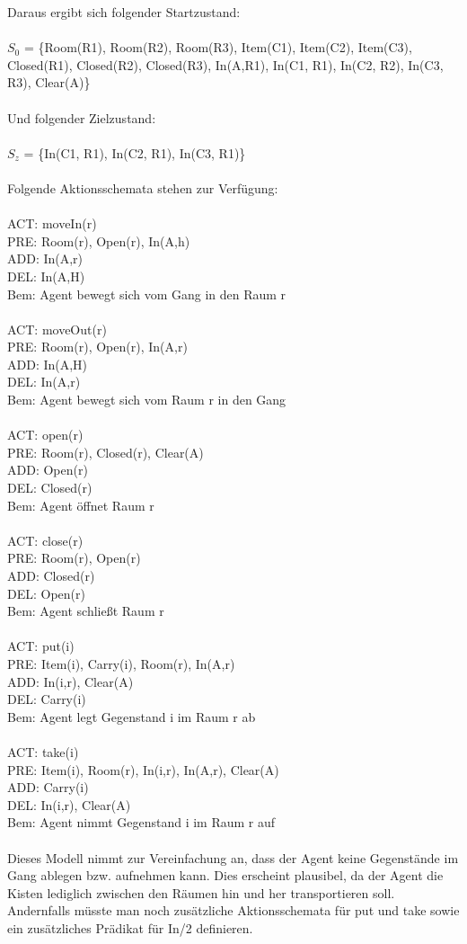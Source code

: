 \documentclass[a4paper]{article}
\begin{document}
Daraus ergibt sich folgender Startzustand:\\
\\
$S_0$ = \{Room(R1), Room(R2), Room(R3), Item(C1), Item(C2), Item(C3), Closed(R1), Closed(R2), Closed(R3),
In(A,R1), In(C1, R1), In(C2, R2), In(C3, R3), Clear(A)\}\\
\\
Und folgender Zielzustand:\\
\\
$S_z$ = \{In(C1, R1), In(C2, R1), In(C3, R1)\}\\
\\
Folgende Aktionsschemata stehen zur Verf\"ugung:\\
\\
ACT: moveIn(r)\\
PRE: Room(r), Open(r), In(A,h)\\
ADD: In(A,r)\\
DEL: In(A,H)\\
Bem: Agent bewegt sich vom Gang in den Raum r\\
\\
ACT: moveOut(r)\\
PRE: Room(r), Open(r), In(A,r)\\
ADD: In(A,H)\\
DEL: In(A,r)\\
Bem: Agent bewegt sich vom Raum r in den Gang\\
\\
ACT: open(r)\\
PRE: Room(r), Closed(r), Clear(A)\\
ADD: Open(r)\\
DEL: Closed(r)\\
Bem: Agent \"offnet Raum r\\
\\
ACT: close(r)\\
PRE: Room(r), Open(r)\\
ADD: Closed(r)\\
DEL: Open(r)\\
Bem: Agent schlie{\ss}t Raum r\\
\\
ACT: put(i)\\
PRE: Item(i), Carry(i), Room(r), In(A,r)\\
ADD: In(i,r), Clear(A)\\
DEL: Carry(i)\\
Bem: Agent legt Gegenstand i im Raum r ab\\
\\
ACT: take(i)\\
PRE: Item(i), Room(r), In(i,r), In(A,r), Clear(A)\\
ADD: Carry(i)\\
DEL: In(i,r), Clear(A)\\
Bem: Agent nimmt Gegenstand i im Raum r auf\\
\\
Dieses Modell nimmt zur Vereinfachung an, dass der Agent keine Gegenst\"ande im Gang ablegen bzw. aufnehmen kann. Dies erscheint plausibel, da der Agent die Kisten lediglich zwischen den R\"aumen hin und her transportieren soll. Andernfalls m\"usste man noch zus\"atzliche Aktionsschemata f\"ur put und take sowie ein zus\"atzliches Pr\"adikat f\"ur In/2 definieren. 
\end{document}
